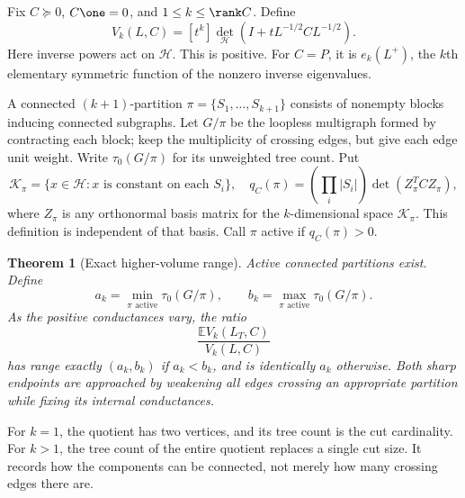 \documentclass[11pt,a4paper]{article}
\newtheorem{theorem}{Theorem}[section]
\theoremstyle{definition}\newtheorem{definition}[theorem]{Definition}
\theoremstyle{remark}\newtheorem{remark}[theorem]{Remark}
\numberwithin{equation}{section}
\begin{document}
Fix $C\succeq0$, $C\one=0$, and $1\le k\le\rank C$. Define
\[
 V_k(L,C)=[t^k]\det_{\mathcal H}(I+tL^{-1/2}CL^{-1/2}).
\]
Here inverse powers act on $\mathcal H$. This is positive. For $C=P$, it is $e_k(L^+)$, the $k$th elementary symmetric function of the nonzero inverse eigenvalues.

A connected $(k+1)$-partition $\pi=\{S_1,\ldots,S_{k+1}\}$ consists of nonempty blocks inducing connected subgraphs. Let $G/\pi$ be the loopless multigraph formed by contracting each block; keep the multiplicity of crossing edges, but give each edge unit weight. Write $\tau_0(G/\pi)$ for its unweighted tree count. Put
\[
 \mathcal K_\pi=\{x\in\mathcal H:x\text{ is constant on each }S_i\},\quad
 q_C(\pi)=\left(\prod_i|S_i|\right)\det(Z_\pi^TCZ_\pi),
\]
where $Z_\pi$ is any orthonormal basis matrix for the $k$-dimensional space $\mathcal K_\pi$. This definition is independent of that basis. Call $\pi$ active if $q_C(\pi)>0$.

\begin{theorem}[Exact higher-volume range]\label{T09-range}
Active connected partitions exist. Define
\[
 a_k=\min_{\pi\text{ active}}\tau_0(G/\pi),\qquad
 b_k=\max_{\pi\text{ active}}\tau_0(G/\pi).
\]
As the positive conductances vary, the ratio
\[
 \frac{\mathbb E V_k(L_T,C)}{V_k(L,C)}
\]
has range exactly $(a_k,b_k)$ if $a_k<b_k$, and is identically $a_k$ otherwise. Both sharp endpoints are approached by weakening all edges crossing an appropriate partition while fixing its internal conductances.
\end{theorem}
For $k=1$, the quotient has two vertices, and its tree count is the cut cardinality. For $k>1$, the tree count of the entire quotient replaces a single cut size. It records how the components can be connected, not merely how many crossing edges there are.
\end{document}
